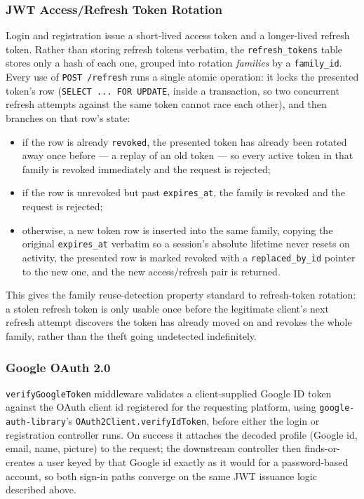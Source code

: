         \subsubsection{JWT Access/Refresh Token Rotation}
        \begin{sloppypar}
        Login and registration issue a short-lived access token and a longer-lived refresh token. Rather than storing refresh tokens verbatim, the \texttt{refresh\_tokens} table stores only a hash of each one, grouped into rotation \emph{families} by a \texttt{family\_id}. Every use of \texttt{POST /refresh} runs a single atomic operation: it locks the presented token's row (\texttt{SELECT~...~FOR~UPDATE}, inside a transaction, so two concurrent refresh attempts against the same token cannot race each other), and then branches on that row's state:
        \begin{itemize}
            \item if the row is already \texttt{revoked}, the presented token has already been rotated away once before --- a replay of an old token --- so every active token in that family is revoked immediately and the request is rejected;
            \item if the row is unrevoked but past \texttt{expires\_at}, the family is revoked and the request is rejected;
            \item otherwise, a new token row is inserted into the same family, copying the original \texttt{expires\_at} verbatim so a session's absolute lifetime never resets on activity, the presented row is marked revoked with a \texttt{replaced\_by\_id} pointer to the new one, and the new access/refresh pair is returned.
        \end{itemize}
        This gives the family reuse-detection property standard to refresh-token rotation: a stolen refresh token is only usable once before the legitimate client's next refresh attempt discovers the token has already moved on and revokes the whole family, rather than the theft going undetected indefinitely.
        \end{sloppypar}

        \subsubsection{Google OAuth 2.0}
        \begin{sloppypar}
        \texttt{verifyGoogleToken} middleware validates a client-supplied Google ID token against the OAuth client id registered for the requesting platform, using \texttt{google-auth-library}'s \texttt{OAuth2Client.verifyIdToken}, before either the login or registration controller runs. On success it attaches the decoded profile (Google id, email, name, picture) to the request; the downstream controller then finds-or-creates a user keyed by that Google id exactly as it would for a password-based account, so both sign-in paths converge on the same JWT issuance logic described above.
        \end{sloppypar}

